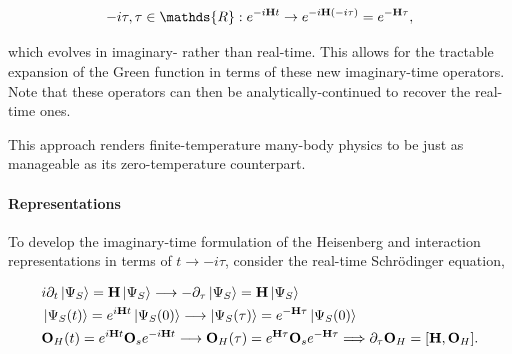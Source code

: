 $$
    -i\tau, \tau \in \mathds{R}: e^{-i {\bf H} t} \rightarrow e^{-i {\bf H} (-i\tau)} = e^{-{\bf H} \tau},
$$

which evolves in imaginary- rather than real-time. This allows for the tractable expansion of the Green function in terms of these new imaginary-time operators. Note that these operators can then be analytically-continued to recover the real-time ones. 

This approach renders finite-temperature many-body physics to be just as manageable as its zero-temperature counterpart. \\

\paragraph{Representations}

To develop the imaginary-time formulation of the Heisenberg and interaction representations in terms of $t \rightarrow -i\tau$, consider the real-time Schr\"odinger equation,

\begin{equation}
    \begin{split}
        &i \partial_t \ket{\Psi_S} = {\bf H} \ket{\Psi_S} \longrightarrow - \partial_{\tau} \ket{\Psi_S} = {\bf H} \ket{\Psi_S}\\
        & \ket{\Psi_S(t)} = e^{i{\bf H}t} \ket{\Psi_S(0)} \longrightarrow \ket{\Psi_S(\tau)} = e^{-{\bf H}\tau} \ket{\Psi_S(0)} \\
        & {\bf O}_H(t) = e^{i{\bf H}t} {\bf O}_s e^{-i{\bf H}t} \longrightarrow {\bf O}_H(\tau) = e^{{\bf H}\tau} {\bf O}_s e^{-{\bf H}\tau} \Longrightarrow \partial_{\tau} {\bf O}_H= [{\bf H}, {\bf O}_H].
    \end{split}
\end{equation}

